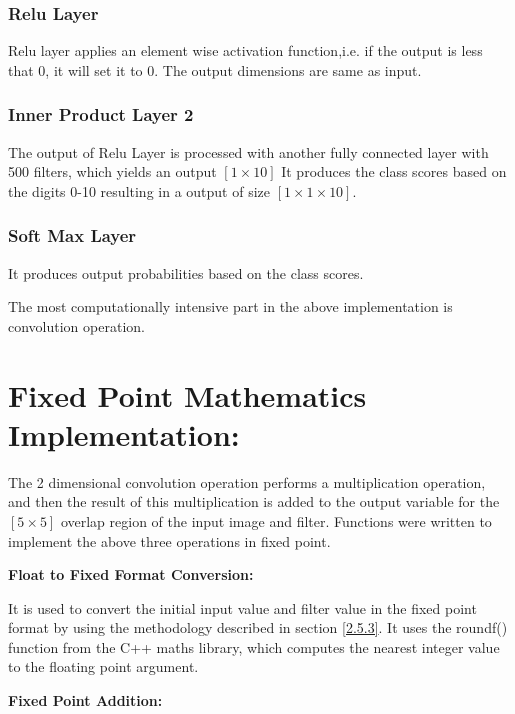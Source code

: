 \subsubsection{Relu Layer}\label{Relu Layer}
Relu layer applies an element wise activation function,i.e. if the output is less that 0, it will set it to 0. The output dimensions are same as input.
\subsubsection{Inner Product Layer 2}\label{Inner Product Layer 2}
The output of Relu Layer is processed with another fully connected layer with 500 filters, which yields an output $[1\times 10]$
It produces the class scores based on the digits 0-10 resulting in a output of size $[1\times 1\times 10]$.
\subsubsection{Soft Max Layer}\label{Soft Max Layer}
It produces output probabilities based on the class scores.

\vspace{0.25cm}
\noindent The most computationally intensive part in the above implementation is convolution operation.

\section{Fixed Point Mathematics Implementation:}
The 2 dimensional convolution operation performs a multiplication operation, and then the result of this multiplication is added to the output variable for the $[5\times 5]$ overlap region of the input image and filter.
Functions were written to implement the above three operations in fixed point.

\vspace{0.25cm}
\noindent \textbf{Float to Fixed Format Conversion:}

\vspace{0.25cm}
\noindent It is used to convert the initial input value and filter value in the fixed point format by using the methodology described in section \ref{2.5.3}. It uses the roundf() function from the C++ maths library, which computes the nearest integer value to the floating point argument.


\vspace{0.25cm}
\noindent \textbf{Fixed Point Addition:}

